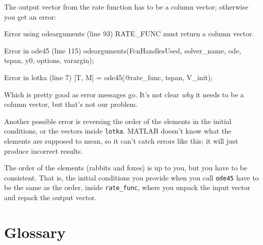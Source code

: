 The output vector from the rate function has to be a column vector; otherwise you get an error:

\begin{code}
Error using odearguments (line 93)
RATE_FUNC must return a column vector.

Error in ode45 (line 115)
  odearguments(FcnHandlesUsed, solver_name, ode, tspan, y0, 
               options, varargin);

Error in lotka (line 7)
    [T, M] = ode45(@rate_func, tspan, V_init);
\end{code}

Which is pretty good as error messages go.  It's not clear {\em why}
it needs to be a column vector, but that's not our problem.


Another possible error is reversing the order of the elements in the
initial conditions, or the vectors inside {\tt lotka}.  MATLAB
doesn't know what the elements are supposed to mean, so it can't catch
errors like this; it will just produce incorrect results.

The order of the elements (rabbits and foxes) is up to you, but
you have to be consistent.  That is, the initial conditions you
provide when you call {\tt ode45} have to be the same as the order,
inside \verb"rate_func", where you unpack the input vector and repack
the output vector.



\section{Glossary}

